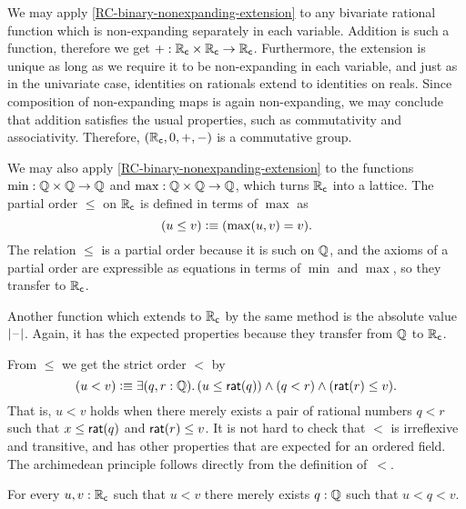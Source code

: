 We may apply \autoref{RC-binary-nonexpanding-extension} to any bivariate rational function
which is non-expanding separately in each variable. Addition is such a function, therefore
we get ${+} : \mathbb{R}_\mathsf{c} \times \mathbb{R}_\mathsf{c} \to \mathbb{R}_\mathsf{c}$.
Furthermore, the extension is unique as long as we
require it to be non-expanding in each variable, and just as in the univariate case,
identities on rationals extend to identities on reals. Since composition of non-expanding
maps is again non-expanding, we may conclude that addition satisfies the usual properties,
such as commutativity and associativity.
Therefore, $(\mathbb{R}_\mathsf{c}, 0, {+}, {-})$ is a commutative
group.

We may also apply \autoref{RC-binary-nonexpanding-extension} to the functions $\min : \mathbb{Q} \times
\mathbb{Q} \to \mathbb{Q}$ and $\max : \mathbb{Q} \times \mathbb{Q} \to \mathbb{Q}$, which turns $\mathbb{R}_\mathsf{c}$ into a lattice. The partial
order $\leq$ on $\mathbb{R}_\mathsf{c}$ is defined in terms of $\max$ as
%
\begin{equation*}
  (u \leq v) \vcentcolon\equiv (\max(u, v) = v).
\end{equation*}
%
The relation $\leq$ is a partial order because it is such on $\mathbb{Q}$, and the axioms of a
partial order are expressible as equations in terms of $\min$ and $\max$, so they transfer
to $\mathbb{R}_\mathsf{c}$.

Another function which extends to $\mathbb{R}_\mathsf{c}$ by the same method is the absolute value $|{\mathord{\hspace{1pt}\text{--}\hspace{1pt}}}|$.
Again, it has the expected properties because they transfer from $\mathbb{Q}$ to $\mathbb{R}_\mathsf{c}$.

From $\leq$ we get the strict order $<$ by
%
\begin{equation*}
  (u < v) \defeq \exis{q, r : \Q} (u \leq \rcrat(q)) \land (q < r) \land (\rcrat(r) \leq v).
\end{equation*}
%
That is, $u < v$ holds when there merely exists a pair of rational numbers $q < r$ such that $x \leq
\mathsf{rat}(q)$ and $\mathsf{rat}(r) \leq v$. It is not hard to check that $<$ is irreflexive and
transitive, and has other properties that are expected for an ordered field.
The archimedean principle follows directly from the definition of~$<$.

\begin{thm} \label{RC-archimedean}
  For every $u, v : \mathbb{R}_\mathsf{c}$ such that $u < v$ there merely exists $q : \mathbb{Q}$ such that $u < q < v$.
\end{thm}

